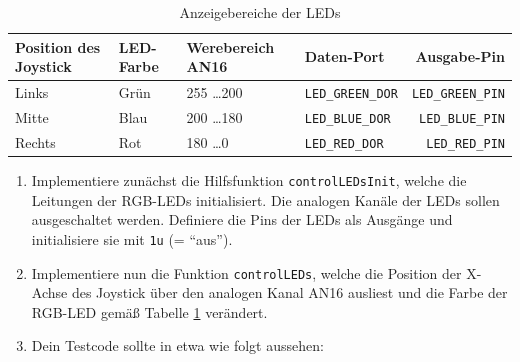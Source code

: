 \begin{table}[!htb]
    \centering
    \caption{Anzeigebereiche der LEDs}
    \label{tab:controlLED}
    \begin{tabular}{llllr}
        \toprule
        \textbf{Position des Joystick} & 
        \textbf{LED-Farbe} & 
        \textbf{Werebereich AN16} & 
        \textbf{Daten-Port} & 
        \textbf{Ausgabe-Pin}\\
        \midrule
        Links & Grün & 255 \dots 200 & \lstinline|LED_GREEN_DOR| & \lstinline|LED_GREEN_PIN| \\
        Mitte & Blau & 200 \dots 180 & \lstinline|LED_BLUE_DOR| & \lstinline|LED_BLUE_PIN| \\
        Rechts & Rot & 180 \dots 0 & \lstinline|LED_RED_DOR| & \lstinline|LED_RED_PIN| \\
        \bottomrule
    \end{tabular}
\end{table}

\begin{enumerate}
\item
Implementiere zunächst die Hilfsfunktion \lstinline|controlLEDsInit|, welche die Leitungen der RGB-LEDs initialisiert. Die analogen Kanäle der LEDs sollen ausgeschaltet werden.
Definiere die Pins der LEDs als Ausgänge und initialisiere sie mit \lstinline|1u| (= \enquote{aus}). 

\item
Implementiere nun die Funktion \lstinline|controlLEDs|, welche die Position der X-Achse des Joystick über den analogen Kanal AN16 ausliest und die Farbe der RGB-LED gemäß Tabelle \ref{tab:controlLED} verändert. 

\item 
Dein Testcode sollte in etwa wie folgt aussehen:

\end{enumerate}

